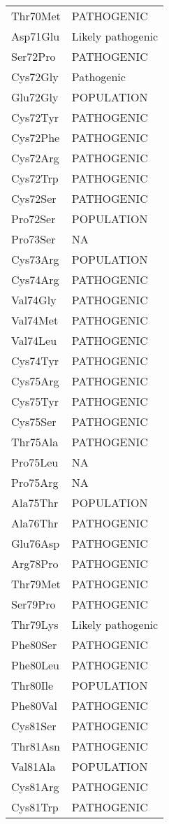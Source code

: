 \begin{tiny}
\begin{longtable}[l]{l|l}
	Thr70Met & PATHOGENIC \\
	Asp71Glu & Likely pathogenic \\
	Ser72Pro & PATHOGENIC \\
	Cys72Gly & Pathogenic \\
	Glu72Gly & POPULATION \\
	Cys72Tyr & PATHOGENIC \\
	Cys72Phe & PATHOGENIC \\
	Cys72Arg & PATHOGENIC \\
	Cys72Trp & PATHOGENIC \\
	Cys72Ser & PATHOGENIC \\
	Pro72Ser & POPULATION \\
	Pro73Ser & NA \\
	Cys73Arg & POPULATION \\
	Cys74Arg & PATHOGENIC \\
	Val74Gly & PATHOGENIC \\
	Val74Met & PATHOGENIC \\
	Val74Leu & PATHOGENIC \\
	Cys74Tyr & PATHOGENIC \\
	Cys75Arg & PATHOGENIC \\
	Cys75Tyr & PATHOGENIC \\
	Cys75Ser & PATHOGENIC \\
	Thr75Ala & PATHOGENIC \\
	Pro75Leu & NA \\
	Pro75Arg & NA \\
	Ala75Thr & POPULATION \\
	Ala76Thr & PATHOGENIC \\
	Glu76Asp & PATHOGENIC \\
	Arg78Pro & PATHOGENIC \\
	Thr79Met & PATHOGENIC \\
	Ser79Pro & PATHOGENIC \\
	Thr79Lys & Likely pathogenic \\
	Phe80Ser & PATHOGENIC \\
	Phe80Leu & PATHOGENIC \\
	Thr80Ile & POPULATION \\
	Phe80Val & PATHOGENIC \\
	Cys81Ser & PATHOGENIC \\
	Thr81Asn & PATHOGENIC \\
	Val81Ala & POPULATION \\
	Cys81Arg & PATHOGENIC \\
	Cys81Trp & PATHOGENIC \\

\end{longtable}
\end{tiny}
